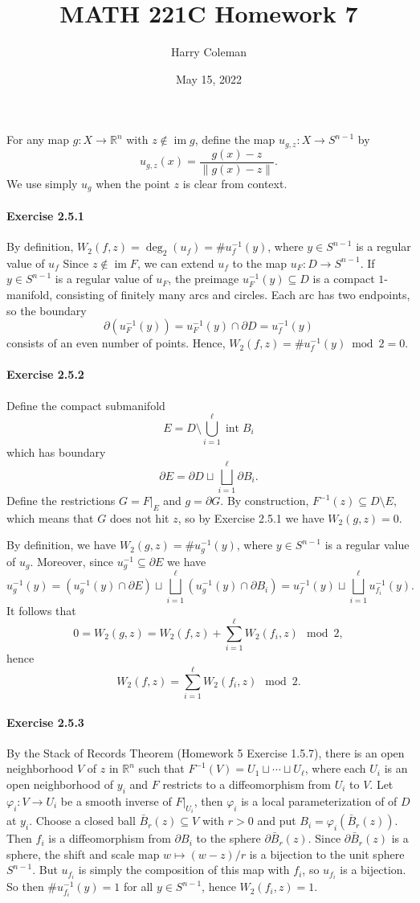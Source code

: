\documentclass[12pt]{article}
\renewcommand{\maketitle}{\thispagestyle{title}}
\newcommand{\pnum}[1]{\paragraph{#1}}
\theoremstyle{definition}
\newcommand{\R}{\mathbb{R}}
\renewcommand{\phi}{\varphi}
\newcommand{\<}{\langle}
\renewcommand{\>}{\rangle}
\newcommand{\seq}{\subseteq}
\DeclareMathOperator{\im}{im}
\newcommand{\bd}{\partial}
\DeclareMathOperator{\inter}{int}
\begin{document}
\title{MATH 221C Homework 7}
\author{Harry Coleman}
\date{May 15, 2022}
\maketitle

For any map $g : X \to \R^n$ with $z \notin \im g$, define the map $u_{g,z} : X \to S^{n-1}$ by
\[
    u_{g,z}(x) = \frac{g(x) - z}{\|g(x) - z\|}.
\]
We use simply $u_g$ when the point $z$ is clear from context.

\pnum{Exercise 2.5.1}

By definition, $W_2(f, z) = \deg_2(u_f) = \#u_f^{-1}(y)$, where $y \in S^{n-1}$ is a regular value of $u_f$
Since $z \notin \im F$, we can extend $u_f$ to the map $u_F : D \to S^{n-1}$.
If $y \in S^{n-1}$ is a regular value of $u_F$, the preimage $u_F^{-1}(y) \seq D$ is a compact $1$-manifold, consisting of finitely many arcs and circles.
Each arc has two endpoints, so the boundary
\[
    \bd (u_F^{-1}(y))
        = u_F^{-1}(y) \cap \bd D
        = u_f^{-1}(y)
\]
consists of an even number of points.
Hence, $W_2(f, z) = \#u_f^{-1}(y) \bmod{2} = 0$.

\pnum{Exercise 2.5.2}

Define the compact submanifold
\[
    E = D \setminus \bigcup_{i=1}^{\ell} \inter B_i
\]
which has boundary
\[
    \bd E = \bd D \sqcup \bigsqcup_{i=1}^{\ell} \bd B_i.
\]
Define the restrictions $G = F|_E$ and $g = \bd G$.
By construction, $F^{-1}(z) \seq D \setminus E$, which means that $G$ does not hit $z$, so by Exercise 2.5.1 we have $W_2(g, z) = 0$.

By definition, we have $W_2(g, z) = \#u_g^{-1}(y)$, where $y \in S^{n-1}$ is a regular value of $u_g$.
Moreover, since $u_g^{-1} \seq \bd E$ we have
\[
    u_g^{-1}(y)
        = \left(u_g^{-1}(y) \cap \bd E\right) \sqcup \bigsqcup_{i=1}^{\ell} \left(u_g^{-1}(y) \cap \bd B_i\right)
        = u_f^{-1}(y) \sqcup \bigsqcup_{i=1}^{\ell} u_{f_i}^{-1}(y).
\]
It follows that
\[
    0 = W_2(g, z) = W_2(f, z) + \sum_{i=1}^{\ell} W_2(f_i, z) \mod{2},
\]
hence
\[
    W_2(f, z) = \sum_{i=1}^{\ell} W_2(f_i, z) \mod{2}.
\]

\pnum{Exercise 2.5.3}

By the Stack of Records Theorem (Homework 5 Exercise 1.5.7), there is an open neighborhood $V$ of $z$ in $\R^n$ such that $F^{-1}(V) = U_1 \sqcup \cdots \sqcup U_\ell$, where each $U_i$ is an open neighborhood of $y_i$ and $F$ restricts to a diffeomorphism from $U_i$ to $V$.
Let $\phi_i : V \to U_i$ be a smooth inverse of $F|_{U_i}$, then $\phi_i$ is a local parameterization of of $D$ at $y_i$.
Choose a closed ball $\bar{B}_r(z) \seq V$ with $r > 0$ and put $B_i = \phi_i(\bar{B}_r(z))$.
Then $f_i$ is a diffeomorphism from $\bd B_i$ to the sphere $\bd \bar{B}_r(z)$.
Since $\bd\bar{B}_{r}(z)$ is a sphere, the shift and scale map $w \mapsto (w - z)/r$ is a bijection to the unit sphere $S^{n-1}$.
But $u_{f_i}$ is simply the composition of this map with $f_i$, so $u_{f_i}$ is a bijection.
So then $\#u_{f_i}^{-1}(y) = 1$ for all $y \in S^{n-1}$, hence $W_2(f_i, z) = 1$.
\end{document}
